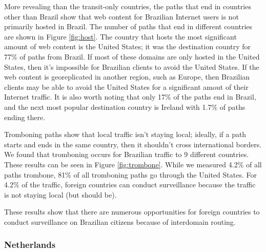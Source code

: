More revealing than the transit-only countries, the paths that end in countries other than Brazil show that web content for Brazilian Internet users is not primarily hosted in Brazil.  The number of paths that end in different countries are shown in Figure \ref{fig:host}.  The country that hosts the most significant amount of web content is the United States; it was the destination country for 77\% of paths from Brazil.  If most of these domains are only hosted in the United States, then it's impossible for Brazilian clients to avoid the United States.  If the web content is georeplicated in another region, such as Europe, then Brazilian clients may be able to avoid the United States for a significant amout of their Internet traffic.  It is also worth noting that only 17\% of the paths end in Brazil, and the next most popular destination country is Ireland with 1.7\% of paths ending there.  

Tromboning paths show that local traffic isn't staying local; ideally, if a path starts and ends in the same country, then it shouldn't cross international borders.  We found that tromboning occurs for Brazilian traffic to 9 different countries.  These results can be seen in Figure \ref{fig:trombone}.  While we measured 4.2\% of all paths trombone, 81\% of all tromboning paths go through the United States.  For 4.2\% of the traffic, foreign countries can conduct surveillance because the traffic is not staying local (but should be). 



These results show that there are numerous opportunities for foreign countries to conduct surveillance on Brazilian citizens because of interdomain routing. 

\subsubsection{Netherlands}

